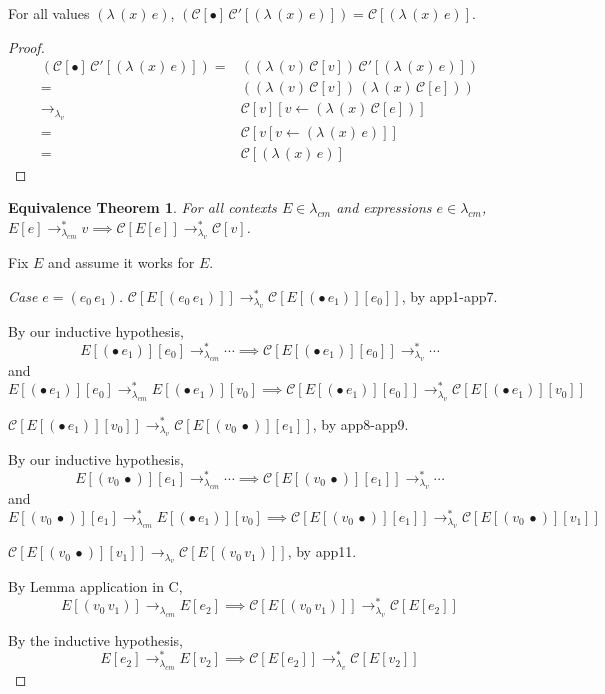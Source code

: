 \documentclass[ms,electronic,twosidetoc,letterpaper,chaptercenter,parttop]{byumsphd}
\newcommand{\lvrr}{\rightarrow_{\lambda_v}}
\newcommand{\lvrrs}{\rightarrow_{\lambda_v}^{*}}
\newcommand{\cmrr}{\rightarrow_{\lambda_{cm}}}
\newcommand{\cmrrs}{\rightarrow_{\lambda_{cm}}^{*}}
\newcommand{\C}[1]{\mathcal{C}[#1]}
\newcommand{\Cp}[1]{\mathcal{C}'[#1]}
\newcommand{\abs}[2]{(\lambda\,(#1)\,#2)}
\newcommand{\app}[2]{(#1\,#2)}
\newcommand{\hole}{\bullet}
\begin{document}
\begin{lemma}
\label{hole-context-to-value}
For all values $\abs{x}{e}$, $\app{\C{\hole}}{\Cp{\abs{x}{e}}}=\C{\abs{x}{e}}$.
\end{lemma}

\begin{proof}
\begin{align*}
\app{\C{\hole}}{\Cp{\abs{x}{e}}} = &\app{\abs{v}{\C{v}}}{\Cp{\abs{x}{e}}}\\
                                 = &\app{\abs{v}{\C{v}}}{\abs{x}{\C{e}}}\\
                             \lvrr &\C{v}[v\leftarrow \abs{x}{\C{e}}]\\
                                 = &\C{v[v\leftarrow \abs{x}{e}]}\\
                                 = &\C{\abs{x}{e}}
\end{align*}
\end{proof}

\newtheorem*{eqtheorem}{Equivalence Theorem}
\begin{eqtheorem}
For all contexts $E\in\lambda_{cm}$ and expressions $e\in\lambda_{cm}$, $E[e]\cmrrs v\implies\C{E[e]}\lvrrs \C{v}$.
\end{eqtheorem}

Fix $E$ and assume it works for $E$.

\begin{proof}[Case $e=\app{e_0}{e_1}$]
$\C{E[\app{e_0}{e_1}]}\lvrrs\C{E[\app{\hole}{e_1}][e_0]}$, by app1-app7.

By our inductive hypothesis, 
\[
E[\app{\hole}{e_1}][e_0]\cmrrs\cdots\implies\C{E[\app{\hole}{e_1}][e_0]}\lvrrs\cdots
\]
and
\[
E[\app{\hole}{e_1}][e_0]\cmrrs E[\app{\hole}{e_1}][v_0]\implies\C{E[\app{\hole}{e_1}][e_0]}\lvrrs\C{E[\app{\hole}{e_1}][v_0]}
\]

$\C{E[\app{\hole}{e_1}][v_0]}\lvrrs\C{E[\app{v_0}{\hole}][e_1]}$, by app8-app9.

By our inductive hypothesis, 
\[
E[\app{v_0}{\hole}][e_1]\cmrrs\cdots\implies\C{E[\app{v_0}{\hole}][e_1]}\lvrrs\cdots
\]
and
\[
E[\app{v_0}{\hole}][e_1]\cmrrs E[\app{\hole}{e_1}][v_0]\implies\C{E[\app{v_0}{\hole}][e_1]}\lvrrs\C{E[\app{v_0}{\hole}][v_1]}
\]

$\C{E[\app{v_0}{\hole}][v_1]}\lvrr\C{E[\app{v_0}{v_1}]}$, by app11.

By Lemma application in C,
\[
E[\app{v_0}{v_1}]\cmrr E[e_2]\implies\C{E[\app{v_0}{v_1}]}\lvrrs\C{E[e_2]}
\]

By the inductive hypothesis,
\[
E[e_2]\cmrrs E[v_2]\implies\C{E[e_2]}\lvrrs\C{E[v_2]}
\]
\end{proof}
\end{document}
